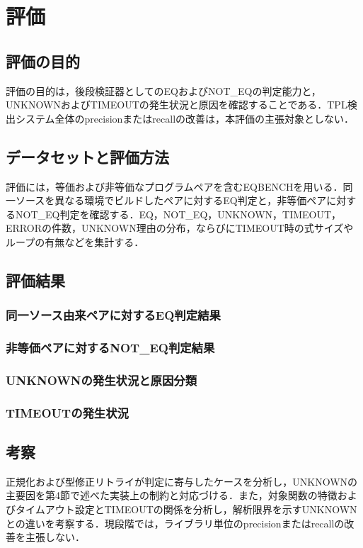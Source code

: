 \section{評価}

\subsection{評価の目的}
評価の目的は，後段検証器としてのEQおよびNOT\_EQの判定能力と，UNKNOWNおよびTIMEOUTの発生状況と原因を確認することである．TPL検出システム全体のprecisionまたはrecallの改善は，本評価の主張対象としない．

\subsection{データセットと評価方法}
評価には，等価および非等価なプログラムペアを含むEQBENCHを用いる．同一ソースを異なる環境でビルドしたペアに対するEQ判定と，非等価ペアに対するNOT\_EQ判定を確認する．EQ，NOT\_EQ，UNKNOWN，TIMEOUT，ERRORの件数，UNKNOWN理由の分布，ならびにTIMEOUT時の式サイズやループの有無などを集計する．

\subsection{評価結果}

\subsubsection{同一ソース由来ペアに対するEQ判定結果}

\subsubsection{非等価ペアに対するNOT\_EQ判定結果}

\subsubsection{UNKNOWNの発生状況と原因分類}

\subsubsection{TIMEOUTの発生状況}

\subsection{考察}
正規化および型修正リトライが判定に寄与したケースを分析し，UNKNOWNの主要因を第4節で述べた実装上の制約と対応づける．また，対象関数の特徴およびタイムアウト設定とTIMEOUTの関係を分析し，解析限界を示すUNKNOWNとの違いを考察する．現段階では，ライブラリ単位のprecisionまたはrecallの改善を主張しない．
